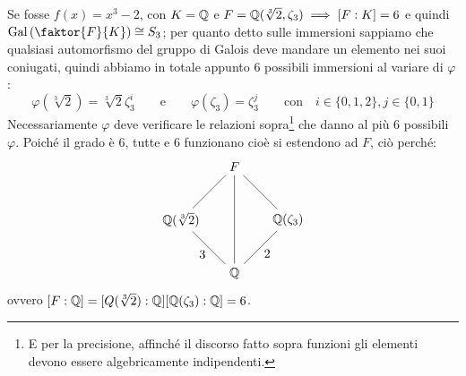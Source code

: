 \documentclass[11pt]{scrartcl}
\begin{document}
\begin{example}
    Se fosse $f(x) = x^3 - 2$, con $K = \mathbb Q$ e $F = \mathbb Q(\sqrt[3]{2},\zeta_3) \implies [F : K] = 6$ e quindi $\Gal\left(\faktor{F}{K}\right) \cong S_3$; per quanto detto sulle immersioni sappiamo che qualsiasi automorfismo del gruppo di Galois 
    deve mandare un elemento nei suoi coniugati, quindi abbiamo in totale appunto 6 possibili immersioni al variare di $\varphi$:
    \[ \varphi(\sqrt[3]{2}) = \sqrt[3]{2}\zeta_3^i \qquad \text{e} \qquad \varphi(\zeta_3) = \zeta_3^j \qquad \text{con}\quad i \in \{0,1,2\},j \in \{0,1\}
        \]
    Necessariamente $\varphi$ deve verificare le relazioni sopra\footnote{E per la precisione, affinché il discorso fatto sopra funzioni gli elementi devono essere algebricamente indipendenti.} che
    danno al più 6 possibili $\varphi$. Poiché il grado è 6, tutte e 6 funzionano cioè si estendono ad $F$, ciò perché:
    \[ \begin{tikzpicture}
        \node (Q1) at (0,0) {$\QQ$};
        \node (Q2) at (1.5,1.5) {$\QQ(\zeta_3)$};
        \node (Q3) at (0,3) {$F$};
        \node (Q4) at (-1.5,1.5) {$\QQ(\sqrt[3]2)$};
        \draw (Q1)--(Q2) node [pos=0.7, below,inner sep=0.25cm] {2};
        \draw (Q1)--(Q4) node [pos=0.7, below,inner sep=0.25cm] {3};
        \draw (Q3)--(Q4) node [pos=0.7, above]{};
        \draw (Q2)--(Q3) node [pos=0.3, above]{};
        \draw (Q1)--(Q3) node [pos=0.7, below, right,inner sep=0.25cm, yshift=-0.4cm]{};
        \end{tikzpicture}
    \]
    ovvero $[F : \mathbb Q] = [Q (\sqrt[3]{2}) : \mathbb Q][\mathbb Q(\zeta_3) : \mathbb Q] = 6$.
\end{example}
\end{document}
